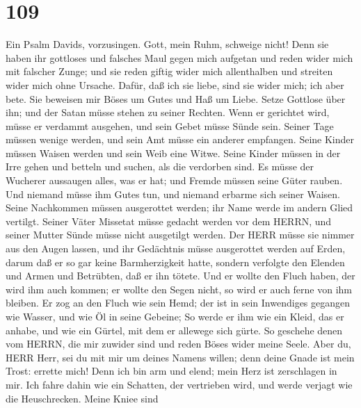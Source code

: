 \hypertarget{section-108}{%
\section{109}\label{section-108}}

 Ein Psalm Davids, vorzusingen. Gott, mein Ruhm, schweige
nicht!  Denn sie haben ihr gottloses und falsches Maul gegen
mich aufgetan und reden wider mich mit falscher Zunge;  und
sie reden giftig wider mich allenthalben und streiten wider mich ohne
Ursache.  Dafür, daß ich sie liebe, sind sie wider mich; ich
aber bete.  Sie beweisen mir Böses um Gutes und Haß um
Liebe.  Setze Gottlose über ihn; und der Satan müsse stehen
zu seiner Rechten.  Wenn er gerichtet wird, müsse er
verdammt ausgehen, und sein Gebet müsse Sünde sein.  Seiner
Tage müssen wenige werden, und sein Amt müsse ein anderer empfangen.
 Seine Kinder müssen Waisen werden und sein Weib eine Witwe.
 Seine Kinder müssen in der Irre gehen und betteln und
suchen, als die verdorben sind.  Es müsse der Wucherer
aussaugen alles, was er hat; und Fremde müssen seine Güter rauben.
 Und niemand müsse ihm Gutes tun, und niemand erbarme sich
seiner Waisen.  Seine Nachkommen müssen ausgerottet werden;
ihr Name werde im andern Glied vertilgt.  Seiner Väter
Missetat müsse gedacht werden vor dem HERRN, und seiner Mutter Sünde
müsse nicht ausgetilgt werden.  Der HERR müsse sie nimmer
aus den Augen lassen, und ihr Gedächtnis müsse ausgerottet werden auf
Erden,  darum daß er so gar keine Barmherzigkeit hatte,
sondern verfolgte den Elenden und Armen und Betrübten, daß er ihn
tötete.  Und er wollte den Fluch haben, der wird ihm auch
kommen; er wollte den Segen nicht, so wird er auch ferne von ihm
bleiben.  Er zog an den Fluch wie sein Hemd; der ist in
sein Inwendiges gegangen wie Wasser, und wie Öl in seine Gebeine;
 So werde er ihm wie ein Kleid, das er anhabe, und wie ein
Gürtel, mit dem er allewege sich gürte.  So geschehe denen
vom HERRN, die mir zuwider sind und reden Böses wider meine Seele.
 Aber du, HERR Herr, sei du mit mir um deines Namens
willen; denn deine Gnade ist mein Trost: errette mich! 
Denn ich bin arm und elend; mein Herz ist zerschlagen in mir.
 Ich fahre dahin wie ein Schatten, der vertrieben wird, und
werde verjagt wie die Heuschrecken.  Meine Kniee sind
